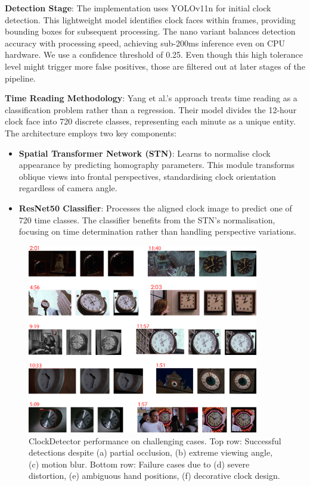 \textbf{Detection Stage}: The implementation uses YOLOv11n for initial clock detection. This lightweight model identifies clock faces within frames, providing bounding boxes for subsequent processing. The nano variant balances detection accuracy with processing speed, achieving sub-200ms inference even on CPU hardware. We use a confidence threshold of 0.25. Even though this high tolerance level might trigger more false positives, those are filtered out at later stages of the pipeline.

\textbf{Time Reading Methodology}: Yang et al.'s approach treats time reading as a classification problem rather than a regression. Their model divides the 12-hour clock face into 720 discrete classes, representing each minute as a unique entity. The architecture employs two key components:
\begin{itemize}
\item \textbf{Spatial Transformer Network (STN)}: Learns to normalise clock appearance by predicting homography parameters. This module transforms oblique views into frontal perspectives, standardising clock orientation regardless of camera angle.
\item \textbf{ResNet50 Classifier}: Processes the aligned clock image to predict one of 720 time classes. The classifier benefits from the STN's normalisation, focusing on time determination rather than handling perspective variations.
\end{itemize}

\begin{figure}[h]
\centering
\includegraphics[width=0.9\textwidth]{figures/Clocks.png}
\caption{ClockDetector performance on challenging cases. Top row: Successful detections despite (a) partial occlusion, (b) extreme viewing angle, (c) motion blur. Bottom row: Failure cases due to (d) severe distortion, (e) ambiguous hand positions, (f) decorative clock design.}
\label{fig:clock-examples}
\end{figure}

